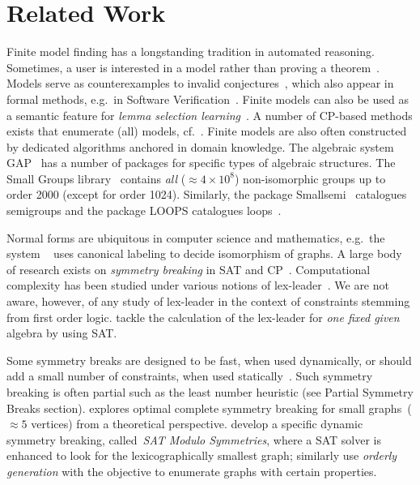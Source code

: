 \section{Related Work}
\label{sec:related}

Finite model finding has a longstanding tradition in automated
reasoning.  Sometimes, a user is interested in a model rather than
proving a theorem~\cite{mace2}. Models serve as counterexamples to
invalid conjectures~\cite{blanchette-lpar10}, which also appear in
formal methods, e.g.\ in Software
Verification~\cite{torlak-tacas07}. Finite models can also be used as
a semantic feature for \emph{lemma selection
  learning}~\cite{urban-ijcar08}.  A number of CP-based methods exists
that enumerate (all) models, cf.~\citet{choiwah-cubes}.
%
Finite models are also often constructed by dedicated
algorithms anchored in domain knowledge. The algebraic system
GAP~\cite{GAP4}  has a number of packages for specific types of algebraic
structures. The Small Groups library~\cite{besche-ijac02} contains
\emph{all} ($\approx 4\times 10^8$) non-isomorphic groups up to order 2000 (except for order 1024).
Similarly, the package Smallsemi~\cite{smallsemi} catalogues semigroups and the package LOOPS
catalogues loops~\cite{loops3.4.1}.

Normal forms are ubiquitous in computer science and mathematics, e.g.\
the system \nauty~\cite{McKayP14} uses canonical labeling to decide
isomorphism of graphs.
%
A large body of research exists on \emph{symmetry breaking} in SAT and
CP~\cite{cp-handbook,sakallah21}.  Computational complexity has been studied
under various notions of lex-leader~\cite{NarodWalshKats,orderings,Luks2004}. We
are not aware, however, of any study of lex-leader in the context of constraints
stemming from first order logic.
%
\citet{janota-mlex} tackle the calculation of the lex-leader for
\emph{one fixed given} algebra by using SAT\@.

%
Some symmetry breaks are designed to
be fast, when used dynamically, or should add a small number of constraints,
when used statically~\cite{Codish2018,codish-aaai20}.
%
Such symmetry breaking is often partial such as the least number
heuristic (see Partial Symmetry Breaks section).  \citet{heule-mcs19}
explores optimal complete symmetry breaking for small
graphs~($\approx 5$ vertices) from a theoretical perspective.
\citet{szeider:cp21} develop a specific dynamic symmetry breaking,
called~\emph{SAT Modulo Symmetries}, where a SAT solver is enhanced to
look for the lexicographically smallest graph; similarly \citet{orderly} use \emph{orderly generation}
with the objective to enumerate graphs with certain properties.
%

